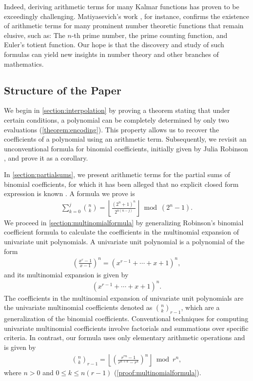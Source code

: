 \documentclass[10pt,a4paper]{article}
\theoremstyle{plain}
\newcommand{\floor}[1]{\left\lfloor #1 \right\rfloor}
\begin{document}
Indeed, deriving arithmetic terms for many Kalmar functions has proven to be exceedingly challenging. Matiyasevich's work \cite{matiyasevich1980diophantine}, for instance, confirms the existence of arithmetic terms for many prominent number theoretic functions that remain elusive, such as: The $n$-th prime number, the prime counting function, and Euler's totient function. Our hope is that the discovery and study of such formulas can yield new insights in number theory and other branches of mathematics.

\subsection{Structure of the Paper}
We begin in \cref{section:interpolation} by proving a theorem stating that under certain conditions, a polynomial can be completely determined by only two evaluations (\cref{theorem:encoding}). This property allows us to recover the coefficients of a polynomial using an arithmetic term. Subsequently, we revisit an unconventional formula for binomial coefficients, initially given by Julia Robinson \cite{robinson1952arithmetic}, and prove it as a corollary.

In \cref{section:partialsums}, we present arithmetic terms for the partial sums of binomial coefficients, for which it has been alleged that no explicit closed form expression is known \cite{boardman2004eggdropnumbers, wikipedia2024binomialcoefficient}. A formula we prove is
\begin{align*}
\sum_{k=0}^{j} \binom{n}{k}
= \floor{\frac{(2^n+1)^n}{2^{n(n-j)}}} \bmod (2^n-1) .
\end{align*}
We proceed in \cref{section:multinomialformula} by generalizing Robinson's binomial coefficient formula to calculate the coefficients in the multinomial expansion of univariate unit polynomials. A univariate unit polynomial is a polynomial of the form
\begin{align*}
    \left(\frac{x^{r}-1}{x-1}\right)^n = (x^{r-1} + \cdots + x + 1)^n  ,
\end{align*}
and its multinomial expansion is given by
\begin{align*}
 [x^k](x^{r-1} + \cdots + x + 1)^n .
\end{align*}
The coefficients in the multinomial expansion of univariate unit polynomials are the univariate multinomial coefficients denoted as $\binom{n}{k}_{r-1}$, which are a generalization of the binomial coefficients. Conventional techniques for computing univariate multinomial coefficients involve factorials and summations over specific criteria. In contrast, our formula uses only elementary arithmetic operations and is given by
\begin{align*}
    \binom{n}{k}_{r-1} = \left\lfloor\left(\frac{r^{rn} - 1}{r^{n+k} - r^k}\right)^n\right\rfloor \bmod r^n ,
\end{align*}
where $n > 0$ and $0 \leq k \leq n (r-1)$ (\cref{proof:multinomialformula}).
\end{document}
